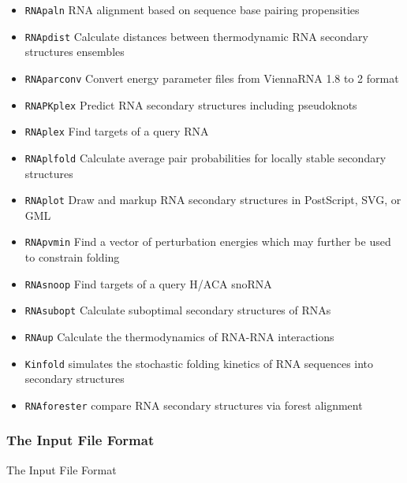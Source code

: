 \documentclass[]{article}
\begin{document}
\begin{itemize}
\item \texttt{RNApaln} RNA alignment based on sequence base pairing propensities\\
\item \texttt{RNApdist} Calculate distances between thermodynamic RNA secondary structures ensembles\\
\item \texttt{RNAparconv} Convert energy parameter files from ViennaRNA 1.8 to 2 format\\
\item \texttt{RNAPKplex} Predict RNA secondary structures including pseudoknots\\
\item \texttt{RNAplex} Find targets of a query RNA\\
\item \texttt{RNAplfold} Calculate average pair probabilities for locally stable secondary structures\\
\item \texttt{RNAplot} Draw and markup RNA secondary structures in PostScript, SVG, or GML\\
\item \texttt{RNApvmin} Find a vector of perturbation energies which may further be used to constrain folding\\
\item \texttt{RNAsnoop} Find targets of a query H/ACA snoRNA\\
\item \texttt{RNAsubopt} Calculate suboptimal secondary structures of RNAs\\
\item \texttt{RNAup} Calculate the thermodynamics of RNA-RNA interactions\\
\item \texttt{Kinfold} simulates the stochastic folding kinetics of RNA sequences into secondary structures \\
\item \texttt{RNAforester} compare RNA secondary structures via forest alignment\\
\end{itemize}

\subsubsection{The Input File Format}{The Input File Format}\label{the-input-file-format}
\end{document}
